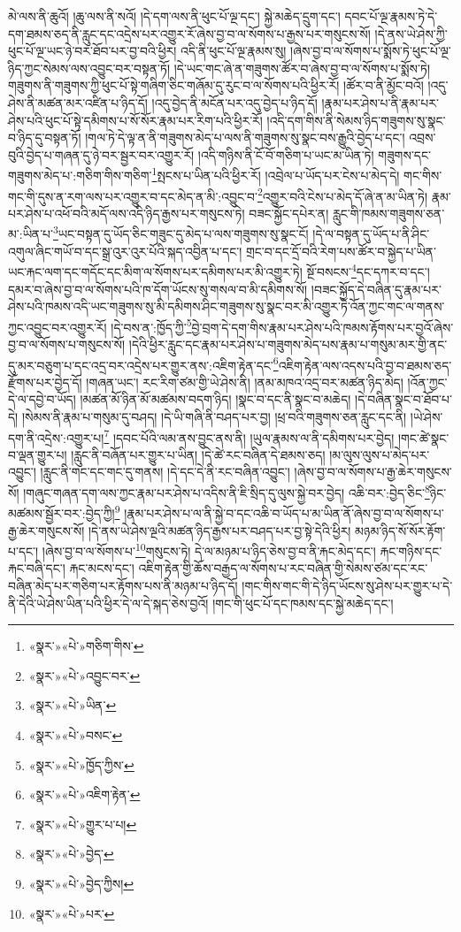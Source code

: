 མེ་ལས་ནི་ཆུའོ། །ཆུ་ལས་ནི་སའོ། །དེ་དག་ལས་ནི་ཕུང་པོ་ལྔ་དང་། སྐྱེ་མཆེད་དྲུག་དང་། དབང་པོ་ལྔ་རྣམས་ཏེ་དེ་དག་ཐམས་ཅད་ནི་རླུང་དང་འདྲེས་པར་འགྱུར་རོ་ཞེས་བྱ་བ་ལ་སོགས་པ་རྒྱས་པར་གསུངས་སོ། །དེ་ནས་ཡེ་ཤེས་ཀྱི་ཕུང་པོ་ལྔ་ཡང་ཉེ་བར་ཐོབ་པར་བྱ་བའི་ཕྱིར། འདི་ནི་ཕུང་པོ་ལྔ་རྣམས་སུ། །ཞེས་བྱ་བ་ལ་སོགས་པ་སྨོས་ཏེ་ཕུང་པོ་ལྔ་ཉིད་ཀྱང་སེམས་ལས་འབྱུང་བར་བསྟན་ཏོ། །དེ་ཡང་གང་ཞེ་ན་གཟུགས་ཚོར་བ་ཞེས་བྱ་བ་ལ་སོགས་པ་སྨོས་ཏེ། གཟུགས་ནི་གཟུགས་ཀྱི་ཕུང་པོ་སྟེ་གཞིག་ཅིང་གཞོམ་དུ་རུང་བ་ལ་སོགས་པའི་ཕྱིར་རོ། །ཚོར་བ་ནི་མྱོང་བའོ། །འདུ་ཤེས་ནི་མཚན་མར་འཛིན་པ་ཉིད་དོ། །འདུ་བྱེད་ནི་མངོན་པར་འདུ་བྱེད་པ་ཉིད་དོ། །རྣམ་པར་ཤེས་པ་ནི་རྣམ་པར་ཤེས་པའི་ཕུང་པོ་སྟེ་དམིགས་པ་སོ་སོར་རྣམ་པར་རིག་པའི་ཕྱིར་རོ། །འདི་དག་གིས་ནི་སེམས་ཉིད་གཟུགས་སུ་སྣང་བ་ཉིད་དུ་བསྟན་ཏོ། །གལ་ཏེ་དེ་ལྟ་ན་ནི་གཟུགས་མེད་པ་ལས་ནི་གཟུགས་སུ་སྣང་བས་རྒྱུའི་བྱེད་པ་དང་། འབྲས་བུའི་བྱེད་པ་གཞན་དུ་ཉེ་བར་སྦྱར་བར་འགྱུར་རོ། །འདི་གཉིས་ནི་ངོ་བོ་གཅིག་པ་ཡང་མ་ཡིན་ཏེ། གཟུགས་དང་གཟུགས་མེད་པ་:གཅིག་གིས་གཅིག་\footnote{«སྣར་»«པེ་»གཅིག་གིས་}སྤངས་པ་ཡིན་པའི་ཕྱིར་རོ། །འབྲེལ་པ་ཡོད་པར་ངེས་པ་མེད་དེ། གང་གིས་གང་གི་དུས་ན་རག་ལས་པར་འགྱུར་བ་དང་མེད་ན་མི་:འབྱུང་བ་\footnote{«སྣར་»«པེ་»འབྱུང་བར་}འགྱུར་བའི་ངེས་པ་མེད་དོ་ཞེ་ན་མ་ཡིན་ཏེ། རྣམ་པར་ཤེས་པ་འཕོ་བའི་མདོ་ལས་འདི་ཉིད་རྒྱས་པར་གསུངས་ཏེ། བཟང་སྐྱོང་དཔེར་ན། རླུང་གི་ཁམས་གཟུགས་ཅན་མ་:ཡིན་པ་\footnote{«སྣར་»«པེ་»ཡིན་}ཡང་བསྟན་དུ་ཡོད་ཅིང་གཟུང་དུ་མེད་པ་ལས་གཟུགས་སུ་སྣང་ངོ། །དེ་ལ་བསྟན་དུ་ཡོད་པ་ནི་ཤིང་འགུལ་ཞིང་གཡོ་བ་དང་སྒྲ་འུར་འུར་པོའི་སྐད་འབྱིན་པ་དང་། གྲང་བ་དང་དྲོ་བའི་རེག་པས་ཚོར་བ་སྐྱེད་པ་ཡིན་ཡང་རྐང་ལག་དང་གདོང་དང་མིག་ལ་སོགས་པར་དམིགས་པར་མི་འགྱུར་ཏེ། སྔོ་བསངས་\footnote{«སྣར་»«པེ་»བསང་}དང་དཀར་བ་དང་། དམར་བ་ཞེས་བྱ་བ་ལ་སོགས་པའི་ཁ་དོག་ཡོངས་སུ་གསལ་བ་མི་དམིགས་སོ། །བཟང་སྐྱོད་དེ་བཞིན་དུ་རྣམ་པར་ཤེས་པའི་ཁམས་འདི་ཡང་གཟུགས་སུ་མི་དམིགས་ཤིང་གཟུགས་སུ་སྣང་བར་མི་འགྱུར་ཏེ་འོན་ཀྱང་གང་ལ་གནས་ཀྱང་འབྱུང་བར་འགྱུར་རོ། །དེ་བས་ན་:ཁྱོད་ཀྱི་\footnote{«སྣར་»«པེ་»ཁྱོད་ཀྱིས་}བྱེ་བྲག་དེ་དག་གིས་རྣམ་པར་ཤེས་པའི་ཁམས་རྟོགས་པར་བྱའོ་ཞེས་བྱ་བ་ལ་སོགས་པ་གསུངས་སོ། །དེའི་ཕྱིར་རླུང་དང་རྣམ་པར་ཤེས་པ་གཟུགས་མེད་པས་རྣམ་པ་གསུམ་མར་གྱི་ནང་དུ་མར་བཅུག་པ་དང་འདྲ་བར་འདྲེས་པར་གྱུར་ནས་:འཇིག་རྟེན་དང་\footnote{«སྣར་»«པེ་»འཇིག་རྟེན་}འཇིག་རྟེན་ལས་འདས་པའི་བྱ་བ་ཐམས་ཅད་རྫོགས་པར་བྱེད་དོ། །གཞན་ཡང་། རང་རིག་ཙམ་གྱི་ཡེ་ཤེས་ནི། །ནམ་མཁའ་འདྲ་བར་མཚན་ཉིད་མེད། །འོན་ཀྱང་དེ་ལ་དབྱེ་བ་ཡོད། །མཚན་མོ་ཉིན་མོ་མཚམས་བདག་ཉིད། །སྣང་བ་དང་ནི་སྣང་བ་མཆེད། །དེ་བཞིན་སྣང་བ་ཐོབ་པ་དེ། །སེམས་ནི་རྣམ་པ་གསུམ་དུ་བཤད། །དེ་ཡི་གཞི་ནི་བཤད་པར་བྱ། །ཕྲ་བའི་གཟུགས་ཅན་རླུང་དང་ནི། །ཡེ་ཤེས་དག་ནི་འདྲེས་:འགྱུར་པ།\footnote{«སྣར་»«པེ་»གྱུར་པ་པ།} །དབང་པོའི་ལམ་ནས་བྱུང་ནས་ནི། །ཡུལ་རྣམས་ལ་ནི་དམིགས་པར་བྱེད། །གང་ཚེ་སྣང་བ་ལྡན་གྱུར་པ། །རླུང་ནི་བཞོན་པར་གྱུར་པ་ཡིན། །དེ་ཚེ་རང་བཞིན་དེ་ཐམས་ཅད། །མ་ལུས་ལུས་པ་མེད་པར་འབྱུང་། །རླུང་ནི་གང་དང་གང་དུ་གནས། །དེ་དང་དེ་ནི་རང་བཞིན་འབྱུང་། །ཞེས་བྱ་བ་ལ་སོགས་པ་རྒྱ་ཆེར་གསུངས་སོ། །གཞུང་གཞན་དག་ལས་ཀྱང་རྣམ་པར་ཤེས་པ་འདིས་ནི་ཇི་སྲིད་དུ་ལུས་སྐྱེ་བར་བྱེད། འཆི་བར་:བྱེད་ཅིང་\footnote{«སྣར་»«པེ་»བྱེད་}ཉིང་མཚམས་སྦྱོར་བར་:བྱེད་ཀྱི།\footnote{«སྣར་»«པེ་»བྱེད་ཀྱིས།} །རྣམ་པར་ཤེས་པ་ལ་ནི་སྐྱེ་བ་དང་འཆི་བ་ཡོད་པ་མ་ཡིན་ནོ་ཞེས་བྱ་བ་ལ་སོགས་པ་རྒྱ་ཆེར་གསུངས་སོ། །དེ་ནས་ཡེ་ཤེས་ལྔའི་མཚན་ཉིད་རྒྱས་པར་བཤད་པར་བྱ་སྟེ་དེའི་ཕྱིར། མཉམ་ཉིད་སོ་སོར་རྟོག་པ་དང་། །ཞེས་བྱ་བ་ལ་སོགས་པ་\footnote{«སྣར་»«པེ་»པར་}གསུངས་ཏེ། དེ་ལ་མཉམ་པ་ཉིད་ཅེས་བྱ་བ་ནི་རྐང་མེད་དང་། རྐང་གཉིས་དང་རྐང་བཞི་དང་། རྐང་མངས་དང་། འཇིག་རྟེན་གྱི་ཆོས་བརྒྱད་ལ་སོགས་པ་རང་བཞིན་གྱི་སེམས་ཙམ་དང་རང་བཞིན་མེད་པར་གཅིག་པར་རྟོགས་པས་ནི་མཉམ་པ་ཉིད་དོ། །གང་གིས་གང་གི་དེ་ཉིད་ཡོངས་སུ་ཤེས་པར་གྱུར་པ་དེ་ནི་དེའི་ཡེ་ཤེས་ཡིན་པའི་ཕྱིར་དེ་ལ་དེ་སྐད་ཅེས་བྱའོ། །གང་གི་ཕུང་པོ་དང་ཁམས་དང་སྐྱེ་མཆེད་དང་། 
